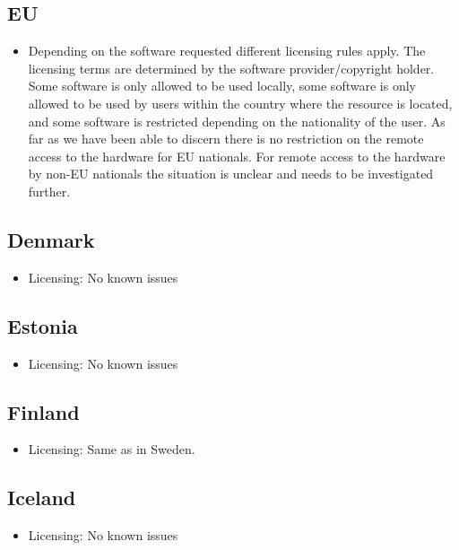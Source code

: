 \documentclass{article}
\begin{document}
\subsection{EU} \label{sec:eu-licensing}
\begin{itemize}
    \item []
    Depending on the software requested different licensing rules apply. The licensing terms are determined by the software provider/copyright holder. Some software is only allowed to be used locally, some software is only allowed to be used by users within the country where the resource is located, and some software is restricted depending on the nationality of the user. As far as we have been able to discern there is no restriction on the remote access to the hardware for EU nationals. For remote access to the hardware by non-EU nationals the situation is unclear and needs to be investigated further.
\end{itemize}
\subsection{Denmark}
\begin{itemize}
    \item [] Licensing:
    No known issues
    \end{itemize}

\subsection{Estonia}
\begin{itemize}
    \item [] Licensing:
    No known issues
    \end{itemize}

\subsection{Finland}
\begin{itemize}
    \item [] Licensing:
Same as in Sweden.
    \end{itemize}

\subsection{Iceland}
\begin{itemize}
    \item [] Licensing:
    No known issues
    \end{itemize}
    
\end{document}
